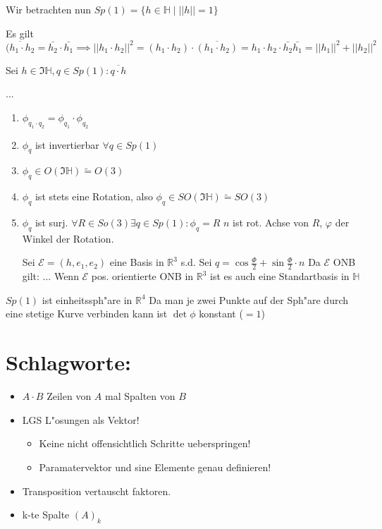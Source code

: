 \documentclass[oneside,fontsize=11pt,paper=a4,BCOR=0mm,DIV=12,automark,headsepline]{scrbook}
\theoremstyle{remark}
\theoremstyle{definition}
\theoremstyle{definition}
\theoremstyle{remark}
\begin{document}
Wir betrachten nun $Sp(1)=\{h\in \mathbb{H} \mid ||h|| = 1\}$

\begin{relation}
  Es gilt $\overline{(h_1\cdot h_2}=\bar{h_2}\cdot \bar{h_1} \implies ||h_1
  \cdot h_2||^2 = (h_1 \cdot h_2) \cdot \overline{(h_1 \cdot h_2)} = h_1\cdot
  h_2 \cdot \bar{h_2} \bar{h_1} = ||h_1||^2 + ||h_2||^2$


  Sei $h\in \Im \mathbb{H}, q\in Sp(1): \overline{q\cdot h }$
\end{relation}

...

\begin{relation}
  \begin{enumerate}
  \item $\phi_{q_1 \cdot q_2} = \phi_{q_1} \cdot \phi_{q_2} $
  \item $\phi_q$ ist invertierbar $\forall q \in Sp(1)$
  \item $\phi_q \in O(\Im \mathbb{H}) \tilde{=} O(3)$
  \item $\phi_q$ ist stets eine Rotation, also $\phi_q \in SO(\Im \mathbb{H})
    \tilde{=} SO(3)$  
  \item $\phi_q$ ist surj. $\forall R\in So(3) \exists q\in Sp(1): \phi_q = R$
    $n$ ist rot. Achse von $R$, $\varphi$ der Winkel der Rotation.

    Sei $\mathcal{E} = (h, e_1, e_2)$ eine Basis in $\mathbb{R}^3$ s.d.
    Sei $q=\cos \frac{\varPhi}{2} + \sin \frac{\varPhi}{2}\cdot n$ Da $\mathcal{E}$
    ONB gilt: ... Wenn $\mathcal{E}$ pos. orientierte ONB in $\mathbb{R}^3$ ist es
    auch eine Standartbasis in $\mathbb{H}$
  \end{enumerate}

  $Sp(1)$ ist einheitssph"are in $\mathbb{R}^4$ Da man je zwei Punkte auf der
  Sph"are durch eine stetige Kurve verbinden kann ist $\det \phi$ konstant ($=1$)
\end{relation}



\section{Schlagworte:}
\label{sec:orgcf8c685}
\begin{itemize}
\item \(A\cdot B\) Zeilen von \(A\) mal Spalten von \(B\)
\item LGS L"osungen als Vektor!
  \begin{itemize}
  \item Keine nicht offensichtlich Schritte ueberspringen!
  \item Paramatervektor und sine Elemente genau definieren!
  \end{itemize}
\item Transposition vertauscht faktoren.
\item k-te Spalte \((A)_k\)
\end{itemize}

\end{document}
